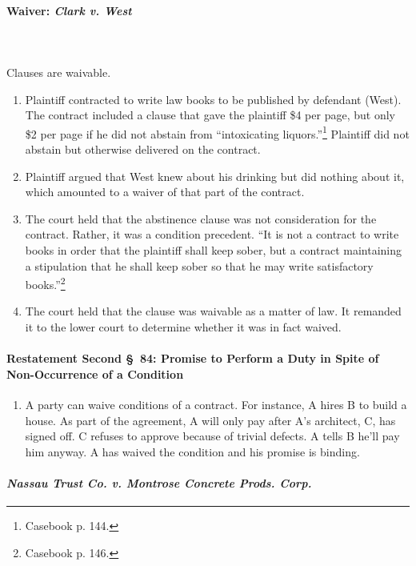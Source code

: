 \paragraph{Waiver: \emph{Clark v. West}}
~\\\\
Clauses are waivable.

\begin{enumerate}
    \item Plaintiff contracted to write law books to be published by defendant 
    (West). The contract included a clause that gave the plaintiff \$4 per 
    page, but only \$2 per page if he did not abstain from ``intoxicating 
    liquors.''\footnote{Casebook p. 144.} Plaintiff did not abstain but 
    otherwise delivered on the contract. 
    \item Plaintiff argued that West knew about his drinking but did nothing 
    about it, which amounted to a waiver of that part of the contract.
    \item The court held that the abstinence clause was not consideration for 
    the contract. Rather, it was a condition precedent. ``It is not a contract 
    to write books in order that the plaintiff shall keep sober, but a 
    contract maintaining a stipulation that he shall keep sober so that he may 
    write satisfactory books.''\footnote{Casebook p. 146.}
    \item The court held that the clause was waivable as a matter of law. It 
    remanded it to the lower court to determine whether it was in fact waived.
\end{enumerate}

\paragraph{Restatement Second \S\ 84: Promise to Perform a Duty in Spite of 
Non-Occurrence of a Condition}

\begin{enumerate}
    \item A party can waive conditions of a contract. For instance, A hires B 
    to build a house. As part of the agreement, A will only pay after A's 
    architect, C, has signed off. C refuses to approve because of trivial 
    defects. A tells B he'll pay him anyway. A has waived the condition and 
    his promise is binding.
\end{enumerate}

\paragraph{\emph{Nassau Trust Co. v. Montrose Concrete Prods. Corp.}}

